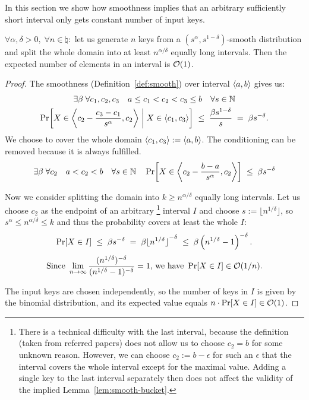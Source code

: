 
In this section we show how smoothness implies that an arbitrary sufficiently short interval only gets constant number of input keys.

\begin{lemma} \label{lem:smooth-bucket}
	$\forall \alpha,\delta > 0, \;
	 \forall n \in \natural:
	$ let us generate $n$ keys from a $(s^\alpha,s^{1-\delta})$-smooth distribution and split the whole domain into at least $n^{\alpha / \delta}$ equally long intervals.
	Then the expected number of elements in an interval is $\mathcal O(1)$.

\begin{proof}

The smoothness (Definition~\ref{def:smooth}) over interval $\left\langle a,b\right\rangle$ gives us:
\begin{multline*}
	\exists\beta \; \forall c_1,c_2,c_3 \quad a \le c_1 < c_2 < c_3 \le b \quad \forall s \in \mathbb{N} \\
		\Pr\!\left[  X \in \left\langle c_2 - \frac{c_3-c_1}{s^\alpha} ,c_2\right\rangle \; \middle| \; X \in \left\langle c_1,c_3\right\rangle  \right]
		\;\le\; \frac{\beta s^{1-\delta}}{s}  \;=\;  \beta s^{-\delta}.
\end{multline*}
We choose to cover the whole domain $\left\langle c_1,c_3\right\rangle := \left\langle a,b\right\rangle$. The conditioning can be removed because it is always fulfilled.
\[
	\exists\beta \; \forall c_2 \quad a < c_2 < b \quad \forall s \in \mathbb{N} \quad
		\Pr\!\left[  X \in \left\langle c_2 - \frac{b-a}{s^\alpha} ,c_2\right\rangle  \right]
		\;\le\; \beta s^{-\delta}
\]

Now we consider splitting the domain into $k \ge n^{\alpha / \delta}$ equally long intervals.
Let us choose $c_2$ as the endpoint of an arbitrary%
	\footnote{There is a technical difficulty with the last interval, because the definition (taken from referred papers) does not allow us to choose $c_2 = b$ for some unknown reason.
	However, we can choose $c_2 := b-\epsilon$ for such an $\epsilon$ that the interval covers the whole interval except for the maximal value. Adding a single key to the last interval separately then does not affect the validity of the implied Lemma~\ref{lem:smooth-bucket}.}
interval $I$ and choose $s:= \lfloor n^{1 / \delta} \rfloor$, so
$ s^\alpha \le n^{\alpha / \delta} \le k $ and thus the probability covers at least the whole $I$:
\[	\Pr\!\left[X \in I\right] \;\le\; \beta s^{-\delta}
	\;=\; \beta {\lfloor n^{1 / \delta} \rfloor}^{-\delta}
	\;\le\; \beta \left( n^{1 / \delta} - 1 \right) ^{-\delta}.
\] \[
\text{Since } \lim_{n \to \infty}
	\frac{ ( n^{1 / \delta} ) ^{-\delta} }{ ( n^{1 / \delta} - 1 ) ^{-\delta} }
	= 1 \text{, we have } \Pr\!\left[X \in I\right] \in \mathcal O(1/n).
\]

The input keys are chosen independently, so the number of keys in $I$ is given by the binomial distribution, and its expected value equals
$ n \cdot \Pr\!\left[X \in I\right] \in \mathcal O(1)$.

\end{proof}
\end{lemma}

